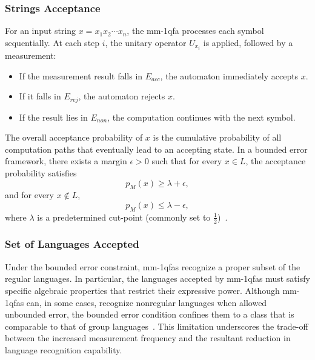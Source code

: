 \subsubsection{Strings Acceptance}
For an input string $x=x_1x_2\cdots x_n$, the \gls{mm-1qfa} processes each symbol sequentially. At each step $i$, the unitary operator $U_{x_i}$ is applied, followed by a measurement:
\begin{itemize}
    \item If the measurement result falls in $E_{acc}$, the automaton immediately accepts $x$.
    \item If it falls in $E_{rej}$, the automaton rejects $x$.
    \item If the result lies in $E_{non}$, the computation continues with the next symbol.
\end{itemize}
The overall acceptance probability of $x$ is the cumulative probability of all computation paths that eventually lead to an accepting state. In a bounded error framework, there exists a margin $\epsilon > 0$ such that for every $x\in L$, the acceptance probability satisfies
\[
p_M(x) \ge \lambda + \epsilon,
\]
and for every $x\notin L$, 
\[
p_M(x) \le \lambda - \epsilon,
\]
where $\lambda$ is a predetermined cut-point (commonly set to $\frac{1}{2}$)~\cite{kondacs1997power,brodsky2002characterizations}.

\subsubsection{Set of Languages Accepted}
Under the bounded error constraint, \glspl{mm-1qfa} recognize a proper subset of the regular languages. In particular, the languages accepted by \glspl{mm-1qfa} must satisfy specific algebraic properties that restrict their expressive power. Although \glspl{mm-1qfa} can, in some cases, recognize nonregular languages when allowed unbounded error, the bounded error condition confines them to a class that is comparable to that of group languages~\cite{brodsky2002characterizations,kondacs1997power}. This limitation underscores the trade-off between the increased measurement frequency and the resultant reduction in language recognition capability.

